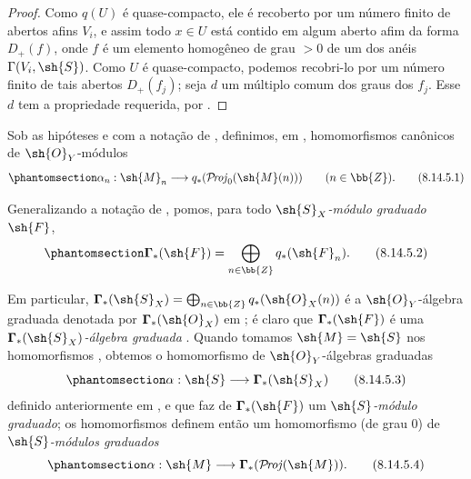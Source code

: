\documentclass[oneside,10pt]{amsart}
\makeatletter
\newcommand{\ega@arrow}[2]{\mathchoice{#1}{#2}{#2}{#2}}
\renewcommand{\to}{\ega@arrow{\longrightarrow}{\rightarrow}}
\def\shProj{\mathcal{P}\!\mathit{roj}}
\newcommand{\oldpage}[2][]{\marginnote{\normalfont\footnotesize\textbf{#1}~|~#2}\ignorespaces}
\let\EGAOriginalLabel\label
\renewcommand{\label}[1]{\phantomsection\EGAOriginalLabel{#1}}
\makeatother
\begin{document}
\begin{proof}
Como $q(U)$ é quase-compacto, ele é recoberto por um número finito de abertos afins $V_i$, e assim todo $x\in U$ está contido em algum aberto afim da forma $D_+(f)$, onde $f$ é um elemento homogêneo de grau $>0$ de um dos anéis $\Gamma(V_i,\sh{S})$.
Como $U$ é quase-compacto, podemos recobri-lo por um número finito de tais abertos $D_+(f_j)$;
seja $d$ um múltiplo comum dos graus dos $f_j$.
Esse $d$ tem a propriedade requerida, por .
\end{proof}

\begin{env}[8.14.5]
\label{II.8.14.5}
Sob as hipóteses e com a notação de , definimos, em , homomorfismos canônicos de $\sh{O}_Y$-módulos
\[
\label{II.8.14.5.1}
    \alpha_n: \sh{M}_n \to q_*(\shProj_0(\sh{M}(n)))
    \qquad (n\in\bb{Z}).
\tag{8.14.5.1}
\]

Generalizando a notação de , pomos, para todo \emph{$\sh{S}_X$-módulo graduado $\sh{F}$},
\[
\label{II.8.14.5.2}
    \boldsymbol{\Gamma}_*(\sh{F}) = \bigoplus_{n\in\bb{Z}}q_*(\sh{F}_n).
\tag{8.14.5.2}
\]

Em particular, $\boldsymbol{\Gamma}_*(\sh{S}_X)=\bigoplus_{n\in\bb{Z}}q_*(\sh{O}_X(n))$ é a $\sh{O}_Y$-álgebra graduada denotada por $\boldsymbol{\Gamma}_*(\sh{O}_X)$ em ;
é claro que $\boldsymbol{\Gamma}_*(\sh{F})$ é uma \emph{$\boldsymbol{\Gamma}_*(\sh{S}_X)$-álgebra graduada} .
Quando
\oldpage[II]{199}
tomamos $\sh{M}=\sh{S}$ nos homomorfismos , obtemos o homomorfismo de $\sh{O}_Y$-álgebras graduadas
\[
\label{II.8.14.5.3}
    \alpha:\sh{S}\to\boldsymbol{\Gamma}_*(\sh{S}_X)
\tag{8.14.5.3}
\]
definido anteriormente em , e que faz de $\boldsymbol{\Gamma}_*(\sh{F})$ um \emph{$\sh{S}$-módulo graduado};
os homomorfismos  definem então um homomorfismo (de grau $0$) de \emph{$\sh{S}$-módulos graduados}
\[
\label{II.8.14.5.4}
    \alpha:\sh{M}\to\boldsymbol{\Gamma}_*(\shProj(\sh{M})).
\tag{8.14.5.4}
\]
\end{env}
\end{document}
